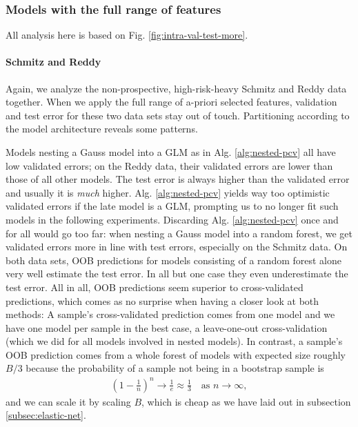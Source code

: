 \subsubsection{Models with the full range of features}



All analysis here is based on Fig. \ref{fig:intra-val-test-more}.

\paragraph{Schmitz and Reddy}
Again, we analyze the non-prospective, high-risk-heavy Schmitz and Reddy data together. When we apply
the full range of a-priori selected features, validation and test error for these two data sets 
stay out of touch. Partitioning according to the model architecture reveals some patterns. 

Models 
nesting a Gauss model into a GLM as in Alg. \ref{alg:nested-pcv} all have low validated errors; on 
the Reddy data, their validated errors are lower than those of all other models. The test error is 
always higher than the validated error and usually it is \textit{much} higher. Alg. \ref{alg:nested-pcv} 
yields way too optimistic validated errors if the late model is a GLM, prompting us to no longer 
fit such models in the following experiments. Discarding Alg. \ref{alg:nested-pcv} once and for all
would go too far: when nesting a Gauss model into a random forest, we get validated errors more in 
line with test errors, especially on the Schmitz data. On both data sets, OOB predictions for 
models consisting of a random forest alone very well estimate the test error. In all but one case 
they even underestimate the test error. All in all, OOB predictions seem superior to 
cross-validated predictions, which comes as no surprise when having a closer look at both 
methods: A sample's cross-validated prediction comes from one model and we have one model per 
sample in the best case, a leave-one-out cross-validation (which we did for all models involved in 
nested models). In contrast, a sample's OOB prediction comes from a whole forest of models with 
expected size roughly $B/3$ because the probability of a sample not being in a bootstrap sample 
is
\begin{align}
    \left( 1 - \frac{1}{n} \right)^n \to \frac{1}{e} \approx \frac{1}{3} \quad \text{as } n \to 
    \infty,
\end{align}
and we can scale it by scaling $B$, which is cheap as we have laid out in subsection 
\ref{subsec:elastic-net}.

